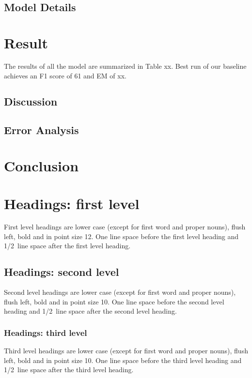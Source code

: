 \documentclass{article} %
\begin{document}
\subsection{Model Details}


\section{Result}
The results of all the model are summarized in Table xx. Best run of our baseline achieves an F1 score of 61 and EM of xx.

\subsection{Discussion}
\subsection{Error Analysis}

\section{Conclusion}

\section{Headings: first level}
\label{headings}

First level headings are lower case (except for first word and proper nouns),
flush left, bold and in point size 12. One line space before the first level
heading and 1/2~line space after the first level heading.

\subsection{Headings: second level}

Second level headings are lower case (except for first word and proper nouns),
flush left, bold and in point size 10. One line space before the second level
heading and 1/2~line space after the second level heading.

\subsubsection{Headings: third level}

Third level headings are lower case (except for first word and proper nouns),
flush left, bold and in point size 10. One line space before the third level
heading and 1/2~line space after the third level heading.
\end{document}
